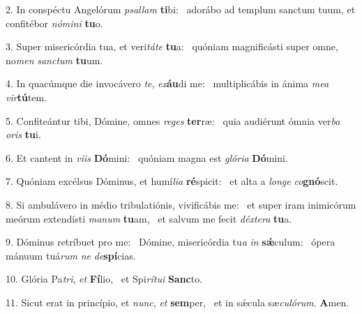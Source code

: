 2. In conspéctu Angelórum \textit{psal}\textit{lam} \textbf{ti}bi: \ast\  adorábo ad templum sanctum tuum, et confitébor \textit{nó}\textit{mi}\textit{ni} \textbf{tu}o.\

3. Super misericórdia tua, et veri\textit{tá}\textit{te} \textbf{tu}a: \ast\  quóniam magnificásti super omne, no\textit{men} \textit{sanc}\textit{tum} \textbf{tu}um.\

4. In quacúmque die invocávero \textit{te}, \textit{ex}\textbf{áu}di me: \ast\  multiplicábis in ánima \textit{me}\textit{a} \textit{vir}\textbf{tú}tem.\

5. Confiteántur tibi, Dómine, omnes \textit{re}\textit{ges} \textbf{ter}ræ: \ast\  quia audiérunt ómnia ver\textit{ba} \textit{o}\textit{ris} \textbf{tu}i.\

6. Et cantent in \textit{vi}\textit{is} \textbf{Dó}mini: \ast\  quóniam magna est \textit{gló}\textit{ri}\textit{a} \textbf{Dó}mini.\

7. Quóniam excélsus Dóminus, et humí\textit{li}\textit{a} \textbf{ré}spicit: \ast\  et alta a \textit{lon}\textit{ge} \textit{co}\textbf{gnó}scit.\

8. Si ambulávero in médio tribulatiónis, vivificábis me: \dag\  et super iram inimicórum meórum extendísti \textit{ma}\textit{num} \textbf{tu}am, \ast\  et salvum me fecit \textit{déx}\textit{te}\textit{ra} \textbf{tu}a.\

9. Dóminus retríbuet pro me: \dag\  Dómine, misericórdia tu\textit{a} \textit{in} \textbf{sǽ}culum: \ast\  ópera mánuum tuá\textit{rum} \textit{ne} \textit{de}\textbf{spí}cias.\

10. Glória Pa\textit{tri}, \textit{et} \textbf{Fí}lio, \ast\  et Spi\textit{rí}\textit{tu}\textit{i} \textbf{Sanc}to.\

11. Sicut erat in princípio, et \textit{nunc}, \textit{et} \textbf{sem}per, \ast\  et in sǽcula sæ\textit{cu}\textit{ló}\textit{rum}. \textbf{A}men.\

